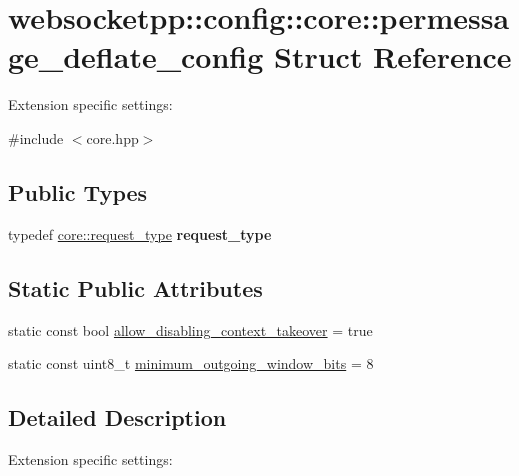 \hypertarget{structwebsocketpp_1_1config_1_1core_1_1permessage__deflate__config}{}\section{websocketpp\+:\+:config\+:\+:core\+:\+:permessage\+\_\+deflate\+\_\+config Struct Reference}
\label{structwebsocketpp_1_1config_1_1core_1_1permessage__deflate__config}


Extension specific settings\+:  




{\ttfamily \#include $<$core.\+hpp$>$}

\subsection*{Public Types}
\begin{DoxyCompactItemize}
\item 
typedef \hyperlink{classwebsocketpp_1_1http_1_1parser_1_1request}{core\+::request\+\_\+type} {\bfseries request\+\_\+type}\hypertarget{structwebsocketpp_1_1config_1_1core_1_1permessage__deflate__config_aba198d4d1a05699588fb13335b57b38c}{}\label{structwebsocketpp_1_1config_1_1core_1_1permessage__deflate__config_aba198d4d1a05699588fb13335b57b38c}

\end{DoxyCompactItemize}
\subsection*{Static Public Attributes}
\begin{DoxyCompactItemize}
\item 
static const bool \hyperlink{structwebsocketpp_1_1config_1_1core_1_1permessage__deflate__config_ac9b85348637f891c2965e15532a7018e}{allow\+\_\+disabling\+\_\+context\+\_\+takeover} = true
\item 
static const uint8\+\_\+t \hyperlink{structwebsocketpp_1_1config_1_1core_1_1permessage__deflate__config_aa43d8526e2b89349b3fd9a5372507594}{minimum\+\_\+outgoing\+\_\+window\+\_\+bits} = 8
\end{DoxyCompactItemize}


\subsection{Detailed Description}
Extension specific settings\+: 

